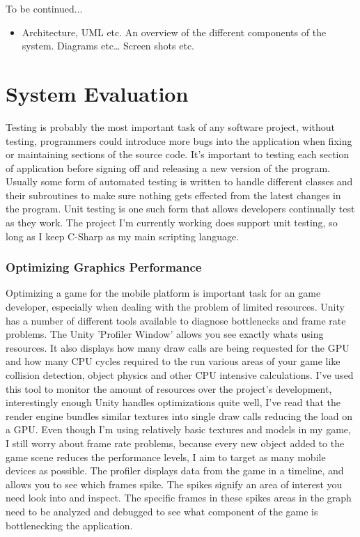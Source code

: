 To be continued...

\begin{itemize}
\item Architecture, UML etc. An overview of the different components of the system. Diagrams etc… Screen shots etc.
\end{itemize}

\chapter{System Evaluation}
Testing is probably the most important task of any software project, without testing, programmers could introduce more bugs into the application when fixing or maintaining sections of the source code. It's important to testing each section of application before signing off and releasing a new version of the program. Usually some form of automated testing is written to handle different classes and their subroutines to make sure nothing gets effected from the latest changes in the program. Unit testing is one such form that allows developers continually test as they work. The project I'm currently working does support unit testing, so long as I keep C-Sharp as my main scripting language.
\subsection{Optimizing Graphics Performance}
Optimizing a game for the mobile platform is important task for an game developer, especially when dealing with the problem of limited resources.
Unity has a number of different tools available to diagnose bottlenecks and frame rate problems. The Unity 'Profiler Window' allows you see exactly whats using resources. It also displays how many draw calls are being requested for the GPU and how many CPU cycles required to the run various areas of your game like collision detection, object physics and other CPU intensive calculations. I've used this tool to monitor the amount of resources over the project's development, interestingly enough Unity handles optimizations quite well, I've read that the render engine bundles similar textures into single draw calls reducing the load on a GPU. Even though I'm using relatively basic textures and models in my game, I still worry about frame rate problems, because every new object added to the game scene reduces the performance levels, I aim to target as many mobile devices as possible. The profiler displays data from the game in a timeline, and allows you to see which frames spike. The spikes signify an area of interest you need look into and inspect. The specific frames in these spikes areas in the graph need to be analyzed and debugged to see what component of the game is bottlenecking the application.

